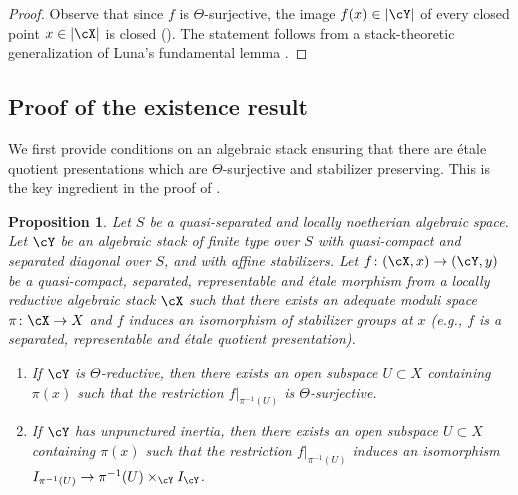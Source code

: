 \documentclass[a4paper]{amsart}
\numberwithin{equation}{section}
\theoremstyle{plain}
\newtheorem{prop}[thm]{Proposition}
\theoremstyle{definition}
\newcommand{\co}{\colon}
\newcommand{\jochennew}[1]{{\color{red}{#1}}}
\begin{document}
 \begin{proof}
	Observe that since $f$ is $\Theta$-surjective, the image $f(x) \in |\cY|$ of every closed point $x \in |\cX|$ is closed ().  The statement follows from a stack-theoretic generalization of Luna's fundamental lemma \cite[Theorem 3.14]{ahr2}.	
 \end{proof}
  

 
 \subsection{Proof of the existence result} \label{S:existence-proof}
 We first provide conditions on an algebraic stack ensuring that there are \'etale quotient presentations which are $\Theta$-surjective and stabilizer preserving.  This is the key ingredient in the proof of .
 
\begin{prop}  \label{P:quotient-presentations}
Let $S$ be a quasi-separated and locally noetherian algebraic space.  
	Let $\cY$ be an algebraic stack of finite type over $S$ with quasi-compact and separated diagonal over $S$, and with affine stabilizers. Let $f \co (\cX, x) \to (\cY,y)$ be a quasi-compact, separated, representable and \'etale morphism from a {locally reductive} algebraic stack $\cX$ such that there exists an adequate moduli space $\pi \co \cX \to X$ and $f$ induces an isomorphism of stabilizer groups at $x$ (e.g., $f$ is a separated, representable and \'etale quotient presentation). 
\begin{enumerate}
	\item \label{P:quotient-presentations-theta-surjective}
	If $\cY$ is $\Theta$-reductive, then there exists an open subspace $U \subset X$ containing $\pi(x)$ such that the restriction $f|_{\pi^{-1}(U)}$ is $\Theta$-surjective.
	\item \label{P:quotient-presentations-unpunctured}
	If $\cY$ has unpunctured inertia, then there exists an open 
	subspace $U \subset X$ containing $\pi(x)$ such that the restriction $f|_{\pi^{-1}(U)}$ induces an isomorphism $I_{\pi^{-1}(U)} \to \pi^{-1}(U) \times_{\cY} I_{\cY}$.
\end{enumerate}
\end{prop}
\end{document}
